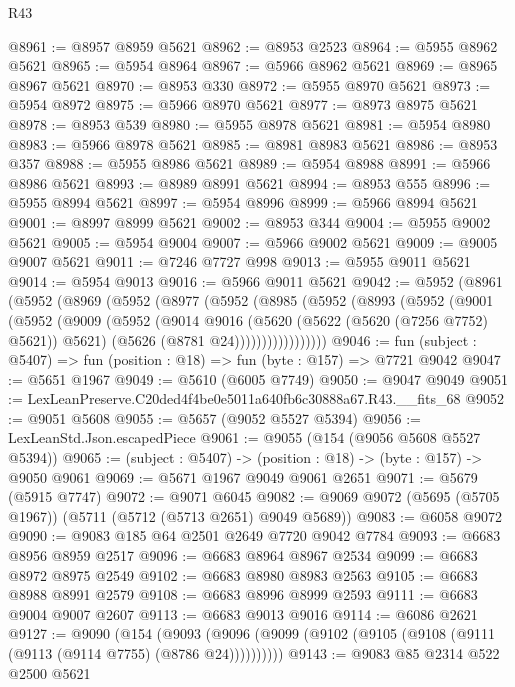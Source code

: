 \begin{lexlean}{R43}
\begin{coremodule}
@8961 := @8957 @8959 @5621
@8962 := @8953 @2523
@8964 := @5955 @8962 @5621
@8965 := @5954 @8964
@8967 := @5966 @8962 @5621
@8969 := @8965 @8967 @5621
@8970 := @8953 @330
@8972 := @5955 @8970 @5621
@8973 := @5954 @8972
@8975 := @5966 @8970 @5621
@8977 := @8973 @8975 @5621
@8978 := @8953 @539
@8980 := @5955 @8978 @5621
@8981 := @5954 @8980
@8983 := @5966 @8978 @5621
@8985 := @8981 @8983 @5621
@8986 := @8953 @357
@8988 := @5955 @8986 @5621
@8989 := @5954 @8988
@8991 := @5966 @8986 @5621
@8993 := @8989 @8991 @5621
@8994 := @8953 @555
@8996 := @5955 @8994 @5621
@8997 := @5954 @8996
@8999 := @5966 @8994 @5621
@9001 := @8997 @8999 @5621
@9002 := @8953 @344
@9004 := @5955 @9002 @5621
@9005 := @5954 @9004
@9007 := @5966 @9002 @5621
@9009 := @9005 @9007 @5621
@9011 := @7246 @7727 @998
@9013 := @5955 @9011 @5621
@9014 := @5954 @9013
@9016 := @5966 @9011 @5621
@9042 := @5952
    (@8961
      (@5952
        (@8969
          (@5952
            (@8977
              (@5952
                (@8985
                  (@5952
                    (@8993
                      (@5952
                        (@9001
                          (@5952
                            (@9009
                              (@5952
                                (@9014
                                  @9016
                                  (@5620 (@5622 (@5620 (@7256 @7752) @5621)) @5621)
                                  (@5626 (@8781 @24)))))))))))))))))
@9046 := fun (subject : @5407) => fun (position : @18) => fun (byte : @157) => @7721 @9042
@9047 := @5651 @1967
@9049 := @5610 (@6005 @7749)
@9050 := @9047 @9049
@9051 := LexLeanPreserve.C20ded4f4be0e5011a640fb6c30888a67.R43.__fits_68
@9052 := @9051 @5608
@9055 := @5657 (@9052 @5527 @5394)
@9056 := LexLeanStd.Json.escapedPiece
@9061 := @9055 (@154 (@9056 @5608 @5527 @5394))
@9065 := (subject : @5407) -> (position : @18) -> (byte : @157) -> @9050 @9061
@9069 := @5671 @1967 @9049 @9061 @2651
@9071 := @5679 (@5915 @7747)
@9072 := @9071 @6045
@9082 := @9069 @9072 (@5695 (@5705 @1967)) (@5711 (@5712 (@5713 @2651) @9049 @5689))
@9083 := @6058 @9072
@9090 := @9083 @185 @64 @2501 @2649 @7720 @9042 @7784
@9093 := @6683 @8956 @8959 @2517
@9096 := @6683 @8964 @8967 @2534
@9099 := @6683 @8972 @8975 @2549
@9102 := @6683 @8980 @8983 @2563
@9105 := @6683 @8988 @8991 @2579
@9108 := @6683 @8996 @8999 @2593
@9111 := @6683 @9004 @9007 @2607
@9113 := @6683 @9013 @9016
@9114 := @6086 @2621
@9127 := @9090
    (@154 (@9093 (@9096 (@9099 (@9102 (@9105 (@9108 (@9111 (@9113 (@9114 @7755) (@8786 @24))))))))))
@9143 := @9083
    @85
    @2314
    @522
    @2500
    @5621

\end{coremodule}
\end{lexlean}
